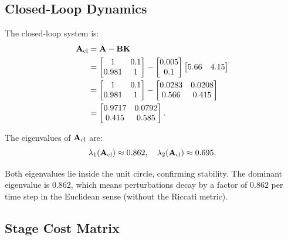 \subsection{Closed-Loop Dynamics}

The closed-loop system is:
\begin{align}
\mathbf{A}_{\text{cl}} &= \mathbf{A} - \mathbf{B}\mathbf{K} \\
&= \begin{bmatrix} 1 & 0.1 \\ 0.981 & 1 \end{bmatrix} - \begin{bmatrix} 0.005 \\ 0.1 \end{bmatrix}
  \begin{bmatrix} 5.66 & 4.15 \end{bmatrix} \\
&= \begin{bmatrix} 1 & 0.1 \\ 0.981 & 1 \end{bmatrix} - \begin{bmatrix} 0.0283 & 0.0208 \\ 0.566 & 0.415 \end{bmatrix} \\
&= \begin{bmatrix} 0.9717 & 0.0792 \\ 0.415 & 0.585 \end{bmatrix}.
\label{eq:ch6:acl}
\end{align}

The eigenvalues of $\mathbf{A}_{\text{cl}}$ are:
\begin{equation}
\lambda_1(\mathbf{A}_{\text{cl}}) \approx 0.862, \quad \lambda_2(\mathbf{A}_{\text{cl}}) \approx 0.695.
\label{eq:ch6:closed-loop-eigs}
\end{equation}

Both eigenvalues lie inside the unit circle, confirming stability. The dominant eigenvalue is $0.862$, which means
perturbations decay by a factor of $0.862$ per time step in the Euclidean sense (without the Riccati metric).

\subsection{Stage Cost Matrix}

